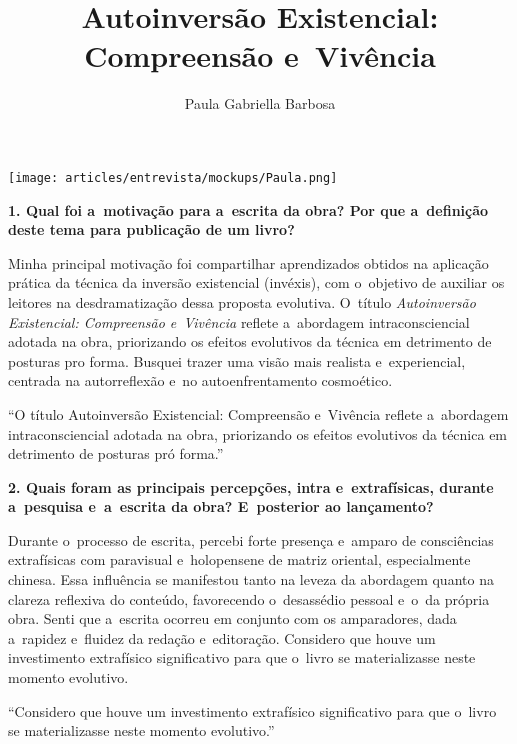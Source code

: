 \documentclass{gescons}
\author{Paula Gabriella Barbosa}
\title{Autoinversão Existencial: Compreensão e~Vivência}
\begin{document}
    \makeentrevistatitle

    \begin{multicols}{2}



\begin{center}
    \texttt{[image: articles/entrevista/mockups/Paula.png]}
\end{center}


\textbf{1. Qual foi a~motivação para a~escrita da obra? Por que a~definição deste tema para publicação de um livro?}

Minha principal motivação foi compartilhar aprendizados obtidos na aplicação prática da técnica da inversão existencial (invéxis), com o~objetivo de auxiliar os leitores na desdramatização dessa proposta evolutiva. O~título \textit{Autoinversão Existencial: Compreensão e~Vivência} reflete a~abordagem intraconsciencial adotada na obra, priorizando os efeitos evolutivos da técnica em detrimento de posturas pro forma. Busquei trazer uma visão mais realista e~experiencial, centrada na autorreflexão e~no autoenfrentamento cosmoético.

\begin{pullquote}
    ``O título Autoinversão Existencial: Compreensão e~Vivência reflete a~abordagem intraconsciencial adotada na obra, priorizando os efeitos evolutivos da técnica em detrimento de posturas pró forma.''
\end{pullquote}

\textbf{2. Quais foram as principais percepções, intra e~extrafísicas, durante a~pesquisa e~a~escrita da obra? E~posterior ao lançamento?}

Durante o~processo de escrita, percebi forte presença e~amparo de consciências extrafísicas com paravisual e~holopensene de matriz oriental, especialmente chinesa. Essa influência se manifestou tanto na leveza da abordagem quanto na clareza reflexiva do conteúdo, favorecendo o~desassédio pessoal e~o~da própria obra. Senti que a~escrita ocorreu em conjunto com os amparadores, dada a~rapidez e~fluidez da redação e~editoração. Considero que houve um investimento extrafísico significativo para que o~livro se materializasse neste momento evolutivo.

\begin{pullquote}
    ``Considero que houve um investimento extrafísico significativo para que o~livro se materializasse neste momento evolutivo.''
\end{pullquote}


\end{multicols}
\end{document}

